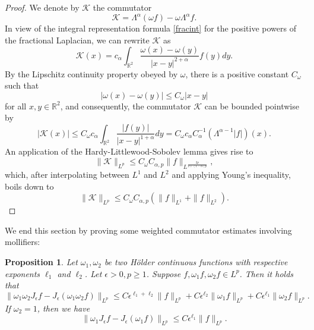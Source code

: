 \documentclass[12pt,reqno]{amsart}
\newcommand{\be}{\begin{equation}}
\newcommand{\ee}{\end{equation}}
\newtheorem{prop}[thm]{Proposition}
\newcommand{\R}{\mathbb R}
\begin{document}
\begin{proof}
 We denote by $\mathcal{K}$ the commutator
 \be 
\mathcal{K} = \Lambda^{\alpha}(\omega f) - \omega \Lambda^{\alpha}f.
 \ee In view of the integral representation formula \eqref{fracint} for the positive powers of the fractional Laplacian, we can rewrite $\mathcal{K}$ as 
 \be 
\mathcal{K}(x) = c_{\alpha}\int_{\R^2}\frac{\omega(x) - \omega(y)}{|x-y|^{2+\alpha}} f(y) dy. 
 \ee By the Lipschitz continuity property obeyed by $\omega$, there is a positive constant $C_{\omega}$ such that 
 \be 
|\omega(x) - \omega(y)| \le C_{\omega}|x-y|
 \ee for all $x, y \in \R^2$, and consequently, the commutator $\mathcal{K}$ can be bounded pointwise by 
 \be 
|\mathcal{K}(x)| \le C_{\omega} c_{\alpha}\int_{\R^2}\frac{|f(y)|}{|x-y|^{1+\alpha}} dy
=  C_{\omega} c_{\alpha}C_{\alpha}^{-1}(\Lambda^{\alpha - 1}|f|)(x).
 \ee An application of the Hardy-Littlewood-Sobolev lemma gives rise to 
 \be 
\|\mathcal{K}\|_{L^p} \le C_{\omega} C_{\alpha,p} \|f\|_{L^{\frac{2p}{2+(1-\alpha)p}}},
 \ee which, after interpolating between $L^1$ and $L^2$ and applying Young's inequality, boils down to 
 \be 
\|\mathcal{K}\|_{L^p} \le C_{\omega} C_{\alpha,p} \left(\|f\|_{L^1} + \|f\|_{L^2} \right).
 \ee 
\end{proof}

We end this section by proving some weighted commutator estimates involving mollifiers:

\begin{prop} Let $\omega_1, \omega_2$ be two H\"older continuous functions with respective exponents $\ell_1$ and $\ell_2$. Let $\epsilon > 0, p \ge 1$. Suppose $f, \omega_1 f, \omega_2 f \in L^p$. Then it holds that 
\be \label{molcom1}
\|\omega_1 \omega_2 J_{\epsilon}f - J_{\epsilon}(\omega_1 \omega_2 f)\|_{L^p}
\le C\epsilon^{\ell_1 + \ell_2} \|f\|_{L^p} + C\epsilon^{\ell_2} \|\omega_1 f\|_{L^p} + C\epsilon^{\ell_1} \|\omega_2 f\|_{L^p}.
\ee  If $\omega_2 = 1$, then we have 
\be \label{malcom5}
\|\omega_1 J_{\epsilon}f - J_{\epsilon}(\omega_1  f)\|_{L^p}
\le C\epsilon^{\ell_1} \|f\|_{L^p}.
\ee 
\end{prop}
\end{document}
